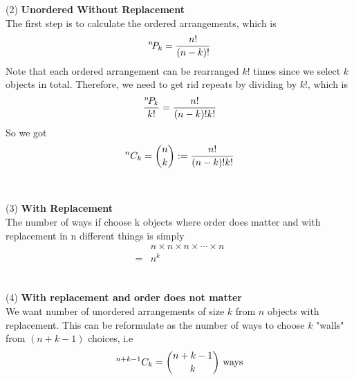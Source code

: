 (2) \textbf{Unordered Without Replacement}\\
The first step is to calculate the ordered arrangements, which is \begin{align*}
{}^{n}\!P_{k}=\frac{n!}{(n-k)!}
\end{align*}
Note that each ordered arrangement can be rearranged $k!$ times since we select $k$ objects in total. Therefore, we need to get rid repeats by dividing by $k!$, which is \begin{align*}
\frac{{}^{n}\!P_{k}}{k!}=\frac{n!}{(n-k)!k!}
\end{align*}
So we got\begin{align*}
{}^{n}C_{k}=\binom nk:=\frac{n!}{(n-k)!k!}
\end{align*}
\hfill\\
\hfill\\
(3) \textbf{With Replacement}\\
The number of ways if choose k objects where order does matter and with replacement in n different things is simply \begin{align*}
&n\times n \times n \times \cdots\times n \\
=&n^k
\end{align*}
\hfill\\
\hfill\\
(4) \textbf{ With replacement and order does not matter}\\
We want number of unordered arrangements of size $k$ from $n$ objects with replacement. This can be reformulate as the number of ways to choose $k$ "walls" from $(n+k-1)$ choices, i.e \begin{align*}
{}^{n+k-1}C_{k}=\binom{n+k-1}{k} \text{ ways}
\end{align*} 
